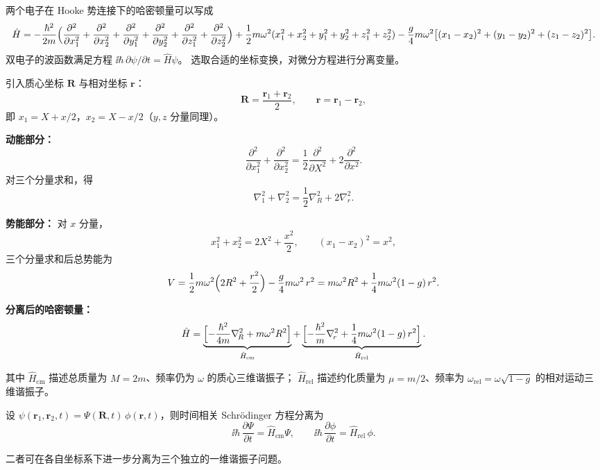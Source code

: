 \begin{question}

两个电子在 Hooke 势连接下的哈密顿量可以写成
\[
\hat H = -\frac{\hbar^{2}}{2m}\Bigl(
\frac{\partial^{2}}{\partial x_{1}^{2}} + \frac{\partial^{2}}{\partial x_{2}^{2}}
+ \frac{\partial^{2}}{\partial y_{1}^{2}} + \frac{\partial^{2}}{\partial y_{2}^{2}}
+ \frac{\partial^{2}}{\partial z_{1}^{2}} + \frac{\partial^{2}}{\partial z_{2}^{2}}
\Bigr)
+ \frac{1}{2}m\omega^{2}(x_{1}^{2}+x_{2}^{2}+y_{1}^{2}+y_{2}^{2}+z_{1}^{2}+z_{2}^{2})
- \frac{g}{4}m\omega^{2}\bigl[(x_{1}-x_{2})^{2} + (y_{1}-y_{2})^{2} + (z_{1}-z_{2})^{2}\bigr].
\]
双电子的波函数满足方程 $\ii\hbar\,\partial\psi/\partial t = \hat H\psi$。
选取合适的坐标变换，对微分方程进行分离变量。

\begin{solution}

引入质心坐标 $\bm R$ 与相对坐标 $\bm r$：
\[
\bm R = \frac{\bm r_{1} + \bm r_{2}}{2},\qquad
\bm r = \bm r_{1} - \bm r_{2},
\]
即 $x_{1}=X+x/2$，$x_{2}=X-x/2$（$y,z$ 分量同理）。

\textbf{动能部分：}
\[
\frac{\partial^{2}}{\partial x_{1}^{2}} + \frac{\partial^{2}}{\partial x_{2}^{2}}
= \frac{1}{2}\frac{\partial^{2}}{\partial X^{2}} + 2\frac{\partial^{2}}{\partial x^{2}}.
\]
对三个分量求和，得
\[
\nabla_{1}^{2} + \nabla_{2}^{2}
= \frac{1}{2}\nabla_{\!R}^{2} + 2\nabla_{r}^{2}.
\]

\textbf{势能部分：} 对 $x$ 分量，
\[
x_{1}^{2}+x_{2}^{2} = 2X^{2} + \frac{x^{2}}{2},\qquad
(x_{1}-x_{2})^{2} = x^{2},
\]
三个分量求和后总势能为
\[
V = \frac{1}{2}m\omega^{2}\Bigl(2R^{2} + \frac{r^{2}}{2}\Bigr)
- \frac{g}{4}m\omega^{2}\,r^{2}
= m\omega^{2}R^{2} + \frac{1}{4}m\omega^{2}(1-g)\,r^{2}.
\]

\textbf{分离后的哈密顿量：}
\[
\hat H = \underbrace{\Bigl[-\frac{\hbar^{2}}{4m}\nabla_{\!R}^{2} + m\omega^{2}R^{2}\Bigr]}_{\hat H_{\mathrm{cm}}}
+ \underbrace{\Bigl[-\frac{\hbar^{2}}{m}\nabla_{\!r}^{2} + \frac{1}{4}m\omega^{2}(1-g)\,r^{2}\Bigr]}_{\hat H_{\mathrm{rel}}}.
\]

其中 $\hat H_{\mathrm{cm}}$ 描述总质量为 $M=2m$、频率仍为 $\omega$ 的质心三维谐振子；
$\hat H_{\mathrm{rel}}$ 描述约化质量为 $\mu=m/2$、频率为
$\omega_{\mathrm{rel}} = \omega\sqrt{1-g}$ 的相对运动三维谐振子。


设 $\psi(\bm r_{1},\bm r_{2},t) = \Psi(\bm R,t)\,\phi(\bm r,t)$，则时间相关 Schr\"odinger 方程分离为
\[
\ii\hbar\,\frac{\partial\Psi}{\partial t} = \hat H_{\mathrm{cm}}\Psi,\qquad
\ii\hbar\,\frac{\partial\phi}{\partial t} = \hat H_{\mathrm{rel}}\,\phi.
\]

二者可在各自坐标系下进一步分离为三个独立的一维谐振子问题。

\end{solution}
\end{question}

